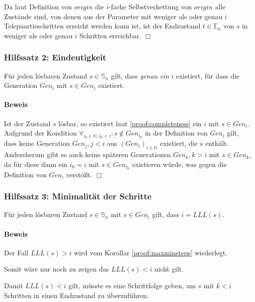\documentclass[a4paper,10pt,ngerman]{scrartcl}
\begin{document}
Da laut Definition von \(origin\) die \(i\)-fache Selbstverkettung von \(origin\) alle Zustände sind, von denen aus der Parameter mit weniger als oder genau \(i\) Telepaartieschritten erreicht werden kann ist, ist der Endzustand \(t \in \mathbb{E}_n\) von \(s\) in weniger als oder genau \(i\) Schritten erreichbar. \(\Box\)

\subsubsection{Hilfssatz 2: Eindeutigkeit} \label{proof:uniqueness}

Für jeden lösbaren Zustand \(s \in \mathbb{S}_n\) gilt, dass \textit{genau ein} \(i\) existiert, für dass die Generation \(Gen_i\) mit \(s \in Gen_i\) existiert.

\paragraph{Beweis}

Ist der Zustand \(s\) lösbar, so existiert laut \cref{proof:completeness} ein \(i\) mit \(s \in Gen_i\). Aufgrund der Kondition \(\forall_{i_0\in\mathbb{N}, i_0 < i}: s \notin Gen_{i_0}\) in der Definition von \(Gen_i\) gilt, dass keine Generation \(Gen_j, j < i\) aus \((Gen_i)_{i\in\mathbb{N}}\) existiert, die \(s\) enthält. Andersherum gibt es auch keine späteren Generationen \(Gen_k, k > i\) mit \(s \in Gen_k\), da für diese dann ein \(i_0 = i\) mit \(s \in Gen_{i_0}\) existieren würde, was gegen die Definition von \(Gen_i\) verstößt. \(\Box\)

\subsubsection{Hilfssatz 3: Minimalität der Schritte} \label{proof:minimality}

Für jeden lösbaren Zustand \(s \in \mathbb{S}_n\) mit \(s \in Gen_i\) gilt, dass \(i = LLL(s)\).

\paragraph{Beweis}

Der Fall \(LLL(s) > i\) wird vom Korollar \cref{proof:maxminsteps} wiederlegt.

Somit wäre nur noch zu zeigen das \(LLL(s) < i\) nicht gilt.

Damit \(LLL(s) < i\) gilt, müsste es eine Schrittfolge geben, um \(s\) mit \(k<i\) Schritten in einen Endzustand zu überzuführen.
\end{document}
